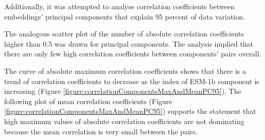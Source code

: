 \documentclass[12pt]{article}
\begin{document}
	\newpage

	Additionally, it was attempted to analyse correlation coefficients between 
	embeddings' principal components that explain 95 percent of data variation.

	The analogous scatter plot of the number of absolute correlation 
	coefficients higher than 0.5 was drawn for principal components.
	The analysis implied that there are only few high correlation coefficients 
	between components' pairs overall.

	\newpage

	The curve of absolute maximum correlation coefficients shows 
	that there is a trend of correlation coefficients to decrease 
	as the index of ESM-1b component is increasing 
	(Figure \ref{figure:correlationComponentsMaxAndMeanPC95}). The following 
	plot of mean correlation coefficients 
	(Figure \ref{figure:correlationComponentsMaxAndMeanPC95}) supports the 
	statement that high maximum values of absolute correlation 
	coefficients are not dominating 
	because the mean correlation is very small between the pairs.
\end{document}
